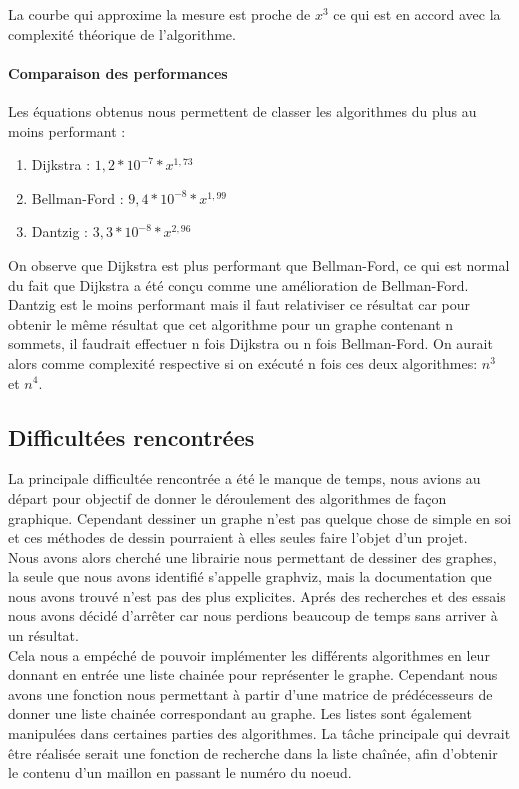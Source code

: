 \documentclass[a4paper,12pt,final] {article}
\begin{document}
La courbe qui approxime la mesure est proche de $x^{3}$ ce qui est en accord avec la complexité théorique de l'algorithme.
\paragraph{Comparaison des performances}
Les équations obtenus nous permettent de classer les algorithmes du plus au moins performant :
\begin{enumerate}
\item Dijkstra :  $1,2*10^{-7}*x^{1,73}$
\item Bellman-Ford :  $9,4*10^{-8}*x^{1,99}$
\item Dantzig : $3,3*10^{-8}*x^{2,96}$
\end{enumerate}
On observe que Dijkstra est plus performant que Bellman-Ford, ce qui est normal du fait que Dijkstra a été con\c cu comme une amélioration de Bellman-Ford.\\

Dantzig est le moins performant mais il faut relativiser ce résultat car pour obtenir le même résultat que cet algorithme pour un graphe contenant n sommets, il faudrait effectuer n fois Dijkstra ou n fois Bellman-Ford. On aurait alors comme complexité respective si on exécuté n fois ces deux algorithmes: $n^{3}$ et $n^{4}$.

\subsection{Difficultées rencontrées}

La principale difficultée rencontrée a été le manque de temps, nous avions au départ pour objectif de donner le déroulement des algorithmes de fa\c con graphique. Cependant dessiner un graphe n'est pas quelque chose de simple en soi et ces méthodes de dessin pourraient à elles seules faire l'objet d'un projet. \\

Nous avons alors cherché une librairie nous permettant de dessiner des graphes, la seule que nous avons identifié s'appelle graphviz, mais la documentation que nous avons trouvé n'est pas des plus explicites. Aprés des recherches et des essais nous avons décidé d'arrêter car nous perdions beaucoup de temps sans arriver à un résultat.\\

Cela nous a empéché de pouvoir implémenter les différents algorithmes en leur donnant en entrée une liste chainée pour représenter le graphe. Cependant nous avons une fonction nous permettant à partir d'une matrice de prédécesseurs de donner une liste chainée correspondant au graphe. Les listes sont également manipulées dans certaines parties des algorithmes. La tâche principale qui devrait être réalisée serait une fonction de recherche dans la liste chaînée, afin d'obtenir le contenu d'un maillon en passant le numéro du noeud.\\
\end{document}
